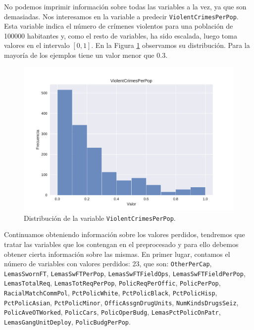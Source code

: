 \documentclass[a4paper, 20pt]{article}
\begin{document}
{No podemos imprimir información sobre todas las variables a la vez, ya que son demasiadas. Nos interesamos en la variable a predecir \texttt{ViolentCrimesPerPop}. Esta variable indica el número de crímenes violentos para una población de 100000 habitantes y, como el resto de variables, ha sido escalada, luego toma valores en el intervalo $[0,1]$. En la Figura \ref{fig:histVCPP} observamos su distribución. Para la mayoría de los ejemplos tiene un valor menor que 0.3.

\begin{figure}[H]
    \centering
    \includegraphics[width=\textwidth]{HistViolentCrimesPerPop}
    \caption{Distribución de la variable \texttt{ViolentCrimesPerPop}.}
    \label{fig:histVCPP}
\end{figure}

Continuamos obteniendo información sobre los valores perdidos, tendremos que tratar las variables que los contengan en el preprocesado y para ello debemos obtener cierta información sobre las mismas. En primer lugar, contamos el número de variables con valores perdidos: 23, que son: \texttt{OtherPerCap}, \texttt{LemasSwornFT}, \texttt{LemasSwFTPerPop}, \texttt{LemasSwFTFieldOps}, \texttt{LemasSwFTFieldPerPop}, \texttt{LemasTotalReq}, \texttt{LemasTotReqPerPop}, \texttt{PolicReqPerOffic}, \texttt{PolicPerPop}, \texttt{RacialMatchCommPol}, \texttt{PctPolicWhite}, \texttt{PctPolicBlack}, \texttt{PctPolicHisp}, \texttt{PctPolicAsian}, \texttt{PctPolicMinor}, \texttt{OfficAssgnDrugUnits}, \texttt{NumKindsDrugsSeiz}, \texttt{PolicAveOTWorked}, \texttt{PolicCars}, \texttt{PolicOperBudg}, \texttt{LemasPctPolicOnPatr}, \texttt{LemasGangUnitDeploy}, \texttt{PolicBudgPerPop}.

}
\end{document}

